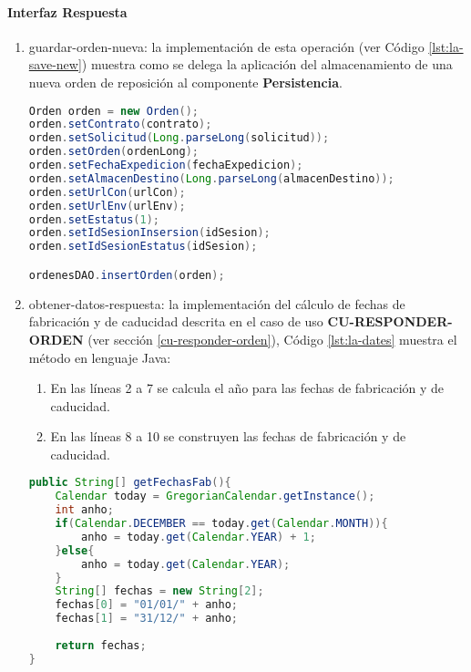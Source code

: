 \paragraph{\indent Interfaz Respuesta}
\begin{enumerate}
	\item guardar-orden-nueva: la implementación de esta operación (ver Código \ref{lst:la-save-new}) muestra como se delega la aplicación del almacenamiento de una nueva orden de reposición al componente \textbf{Persistencia}.
	\begin{lstlisting}[language=Java, caption={Delegación del almacenamiento de una nueva orden de reposición.}, captionpos=b, label={lst:la-save-new}]
Orden orden = new Orden();
orden.setContrato(contrato);
orden.setSolicitud(Long.parseLong(solicitud));
orden.setOrden(ordenLong);
orden.setFechaExpedicion(fechaExpedicion);
orden.setAlmacenDestino(Long.parseLong(almacenDestino));
orden.setUrlCon(urlCon);
orden.setUrlEnv(urlEnv);
orden.setEstatus(1);
orden.setIdSesionInsersion(idSesion);
orden.setIdSesionEstatus(idSesion);

ordenesDAO.insertOrden(orden);
	\end{lstlisting}

	\item obtener-datos-respuesta: la implementación del cálculo de fechas de fabricación y de caducidad descrita en el caso de uso \textbf{CU-RESPONDER-ORDEN} (ver sección \ref{cu-responder-orden}), Código \ref{lst:la-dates} muestra el método en lenguaje Java:
	\begin{enumerate}
		\item En las líneas 2 a 7 se calcula el año para las fechas de fabricación y de caducidad.
		\item En las líneas 8 a 10 se construyen las fechas de fabricación y de caducidad.
	\end{enumerate}
	\begin{lstlisting}[language=Java, caption={Método para calcular las fechas de fabricación y caducidad.}, captionpos=b, label={lst:la-dates}]
public String[] getFechasFab(){
	Calendar today = GregorianCalendar.getInstance();
	int anho;
	if(Calendar.DECEMBER == today.get(Calendar.MONTH)){
		anho = today.get(Calendar.YEAR) + 1;
	}else{
		anho = today.get(Calendar.YEAR);
	}
	String[] fechas = new String[2];
	fechas[0] = "01/01/" + anho;
	fechas[1] = "31/12/" + anho;
	
	return fechas;
}
	\end{lstlisting}


\end{enumerate}
